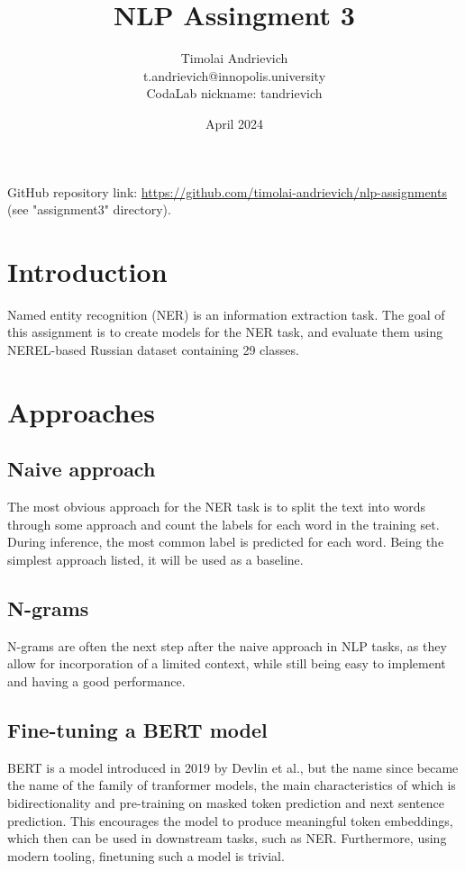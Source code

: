 \documentclass{article}
\title{NLP Assingment 3}
\author{
  Timolai Andrievich \\
  t.andrievich@innopolis.university \\
  CodaLab nickname: tandrievich
}
\date{April 2024}
\begin{document}
\maketitle
  
GitHub repository link: 
\href{https://github.com/timolai-andrievich/nlp-assignments}
{https://github.com/timolai-andrievich/nlp-assignments}
(see "assignment3" directory).

\section{Introduction}

Named entity recognition (NER) is an information extraction task. The goal of 
this assignment is to create models for the NER task, and evaluate them using
NEREL-based Russian dataset containing 29 classes.

\section{Approaches}

\subsection{Naive approach}

The most obvious approach for the NER task is to split the text into words
through some approach and count the labels for each word in the training set.
During inference, the most common label is predicted for each word. Being the
simplest approach listed, it will be used as a baseline.

\subsection{N-grams}

N-grams are often the next step after the naive approach in NLP tasks, as they
allow for incorporation of a limited context, while still being easy to 
implement and having a good performance.

\subsection{Fine-tuning a BERT model}

BERT \cite{devlin2019bert} is a model introduced in 2019 by Devlin et al., but
the name since became the name of the family of tranformer models, the main
characteristics of which is bidirectionality and pre-training on masked
token prediction and next sentence prediction. This encourages the model to
produce meaningful token embeddings, which then can be used in downstream
tasks, such as NER. Furthermore, using modern tooling, finetuning such a model
is trivial.
\end{document}
